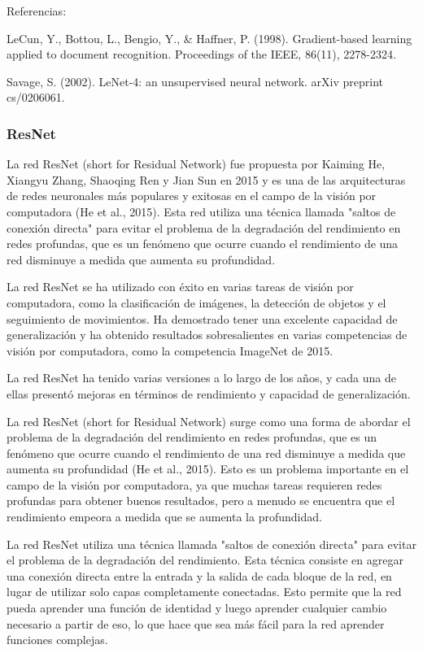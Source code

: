 Referencias:

LeCun, Y., Bottou, L., Bengio, Y., \& Haffner, P. (1998). Gradient-based learning applied to document recognition.
Proceedings of the IEEE, 86(11), 2278-2324.

Savage, S. (2002). LeNet-4: an unsupervised neural network. arXiv preprint cs/0206061.

\subsubsection{ResNet}
La red ResNet (short for Residual Network) fue propuesta por Kaiming He, Xiangyu Zhang, Shaoqing Ren y Jian Sun en 2015
y es una de las arquitecturas de redes neuronales más populares y exitosas en el campo de la visión por computadora (He
et al., 2015). Esta red utiliza una técnica llamada "saltos de conexión directa" para evitar el problema de la
degradación del rendimiento en redes profundas, que es un fenómeno que ocurre cuando el rendimiento de una red
disminuye a medida que aumenta su profundidad.

La red ResNet se ha utilizado con éxito en varias tareas de visión por computadora, como la clasificación de imágenes,
la detección de objetos y el seguimiento de movimientos. Ha demostrado tener una excelente capacidad de generalización
y ha obtenido resultados sobresalientes en varias competencias de visión por computadora, como la competencia ImageNet
de 2015.

La red ResNet ha tenido varias versiones a lo largo de los años, y cada una de ellas presentó mejoras en términos de
rendimiento y capacidad de generalización.

La red ResNet (short for Residual Network) surge como una forma de abordar el problema de la degradación del
rendimiento en redes profundas, que es un fenómeno que ocurre cuando el rendimiento de una red disminuye a medida que
aumenta su profundidad (He et al., 2015). Esto es un problema importante en el campo de la visión por computadora, ya
que muchas tareas requieren redes profundas para obtener buenos resultados, pero a menudo se encuentra que el
rendimiento empeora a medida que se aumenta la profundidad.

La red ResNet utiliza una técnica llamada "saltos de conexión directa" para evitar el problema de la degradación del
rendimiento. Esta técnica consiste en agregar una conexión directa entre la entrada y la salida de cada bloque de la
red, en lugar de utilizar solo capas completamente conectadas. Esto permite que la red pueda aprender una función de
identidad y luego aprender cualquier cambio necesario a partir de eso, lo que hace que sea más fácil para la red
aprender funciones complejas.

